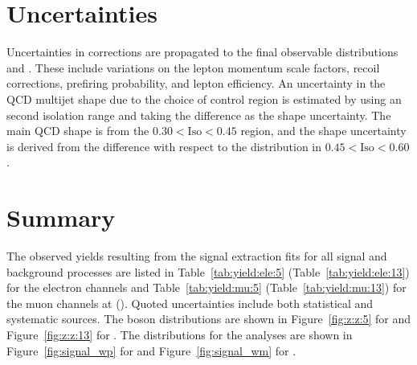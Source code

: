 \section{Uncertainties}\label{ch:unc}

Uncertainties in corrections are propagated to the final observable distributions \mt and \mll. These include variations on the lepton momentum scale factors, recoil corrections, prefiring probability, and lepton efficiency.
An uncertainty in the QCD multijet shape due to the choice of control region is estimated by using an second isolation range and taking the difference as the shape uncertainty. The main QCD \mt shape is from the $0.30 < \mathrm{Iso} < 0.45$ region, and the shape uncertainty is derived from the difference with respect to the \mt distribution in $0.45 < \mathrm{Iso} < 0.60$. 

\section{Summary}

The observed yields resulting from the signal extraction fits for all signal and background processes are listed in Table~\ref{tab:yield:ele:5} (Table~\ref{tab:yield:ele:13}) for the electron channels and Table~\ref{tab:yield:mu:5} (Table~\ref{tab:yield:mu:13}) for the muon channels at \sg (\sh). Quoted uncertainties include both statistical and systematic sources. The \Z boson \mll distributions are shown in Figure~\ref{fig:z:z:5} for \sg and Figure~\ref{fig:z:z:13} for \sh. The \mt distributions for the \W analyses are shown in Figure~\ref{fig:signal_wp} for \Wp and Figure~\ref{fig:signal_wm} for \Wm.

 







